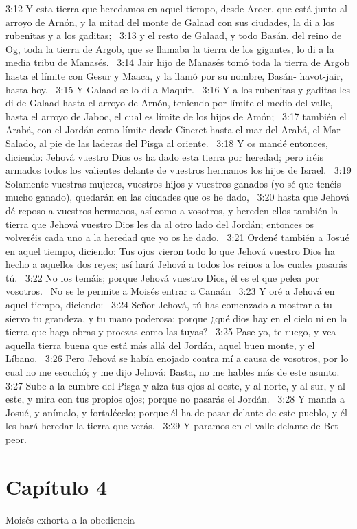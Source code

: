 3:12 Y esta tierra que heredamos en aquel tiempo, desde Aroer, que está junto al arroyo de Arnón, y la mitad del monte de Galaad con sus ciudades, la di a los rubenitas y a los gaditas;  
3:13 y el resto de Galaad, y todo Basán, del reino de Og, toda la tierra de Argob, que se llamaba la tierra de los gigantes, lo di a la media tribu de Manasés.  
3:14 Jair hijo de Manasés tomó toda la tierra de Argob hasta el límite con Gesur y Maaca, y la llamó por su nombre, Basán- havot-jair, hasta hoy.  
3:15 Y Galaad se lo di a Maquir.  
3:16 Y a los rubenitas y gaditas les di de Galaad hasta el arroyo de Arnón, teniendo por límite el medio del valle, hasta el arroyo de Jaboc, el cual es límite de los hijos de Amón;  
3:17 también el Arabá, con el Jordán como límite desde Cineret hasta el mar del Arabá, el Mar Salado, al pie de las laderas del Pisga al oriente.  
3:18 Y os mandé entonces, diciendo: Jehová vuestro Dios os ha dado esta tierra por heredad; pero iréis armados todos los valientes delante de vuestros hermanos los hijos de Israel.  
3:19 Solamente vuestras mujeres, vuestros hijos y vuestros ganados (yo sé que tenéis mucho ganado), quedarán en las ciudades que os he dado,  
3:20 hasta que Jehová dé reposo a vuestros hermanos, así como a vosotros, y hereden ellos también la tierra que Jehová vuestro Dios les da al otro lado del Jordán; entonces os volveréis cada uno a la heredad que yo os he dado.  
3:21 Ordené también a Josué en aquel tiempo, diciendo: Tus ojos vieron todo lo que Jehová vuestro Dios ha hecho a aquellos dos reyes; así hará Jehová a todos los reinos a los cuales pasarás tú.  
3:22 No los temáis; porque Jehová vuestro Dios, él es el que pelea por vosotros.  
No se le permite a Moisés entrar a Canaán  
3:23 Y oré a Jehová en aquel tiempo, diciendo:  
3:24 Señor Jehová, tú has comenzado a mostrar a tu siervo tu grandeza, y tu mano poderosa; porque ¿qué dios hay en el cielo ni en la tierra que haga obras y proezas como las tuyas?  
3:25 Pase yo, te ruego, y vea aquella tierra buena que está más allá del Jordán, aquel buen monte, y el Líbano.  
3:26 Pero Jehová se había enojado contra mí a causa de vosotros, por lo cual no me escuchó; y me dijo Jehová: Basta, no me hables más de este asunto.  
3:27 Sube a la cumbre del Pisga y alza tus ojos al oeste, y al norte, y al sur, y al este, y mira con tus propios ojos; porque no pasarás el Jordán.  
3:28 Y manda a Josué, y anímalo, y fortalécelo; porque él ha de pasar delante de este pueblo, y él les hará heredar la tierra que verás.  
3:29 Y paramos en el valle delante de Bet-peor.  
\section*{Capítulo 4 }
Moisés exhorta a la obediencia  

